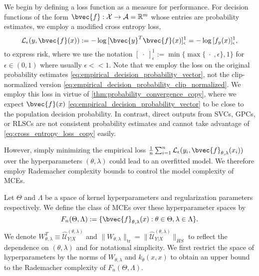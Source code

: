 \documentclass[twoside]{article}
\begin{document}
		We begin by defining a loss function as a measure for performance. For decision functions of the form $\bvec{f} : \mathcal{X} \to \mathcal{A} = \mathbb{R}^{m}$ whose entries are probability estimates, we employ a modified cross entropy loss,
		\begin{equation}
		\mathcal{L}_{\epsilon}(y, \bvec{f}(x)) := - \log{ [\bvec{y}^{T} \bvec{f}(x)]_{\epsilon}^{1} } = - \log{ [f_{y}(x)]_{\epsilon}^{1} },
		\label{eq:cross_entropy_loss_copy}
		\end{equation}
		to express risk, where we use the notation $[\;\cdot\;]_{\epsilon}^{1} := \min\{\max\{\;\cdot\;, \epsilon\}, 1\}$ for $\epsilon \in (0, 1)$ where usually $\epsilon << 1$. Note that we employ the loss on the original probability estimates \eqref{eq:empirical_decision_probability_vector}, not the clip-normalized version \eqref{eq:empirical_decision_probability_clip_normalized}. We employ this loss in virtue of \cref{thm:probability_convergence_copy}, where we expect $\bvec{f}(x)$ \eqref{eq:empirical_decision_probability_vector} to be close to the population decision probability. In contrast, direct outputs from \glspl{SVC}, \glspl{GPC}, or \glspl{RLSC} are not consistent probability estimates and cannot take advantage of \eqref{eq:cross_entropy_loss_copy} easily.
		
		However, simply minimizing the empirical loss $\frac{1}{n} \sum_{i = 1}^{n} \mathcal{L}_{\epsilon}(y_{i}, \bvec{f}_{\theta, \lambda}(x_{i}))$ over the hyperparameters $(\theta, \lambda)$ could lead to an overfitted model. We therefore employ Rademacher complexity bounds to control the model complexity of \glspl{MCE}.
		
		Let $\Theta$ and $\Lambda$ be a space of kernel hyperparameters and regularization parameters respectively. We define the class of \glspl{MCE} over these hyperparameter spaces by	
		\begin{equation}
			F_{n}(\Theta, \Lambda) := \{ \bvec{f}_{\theta, \lambda}(x) : \theta \in \Theta, \lambda \in \Lambda \}.
			\label{eq:predictor_class_copy}
		\end{equation}
		We denote $W_{\theta, \lambda}^{T} \equiv \hat{\mathcal{U}}^{(\theta, \lambda)}_{Y | X}$ and $\| W_{\theta, \lambda} \|_{\mathrm{tr}} = \| \hat{\mathcal{U}}^{(\theta, \lambda)}_{Y | X} \|_{HS}$ to reflect the dependence on $(\theta, \lambda)$ and for notational simplicity. We first restrict the space of hyperparameters by the norms of $W_{\theta, \lambda}$ and $k_{\theta}(x, x)$ to obtain an upper bound to the Rademacher complexity of $F_{n}(\Theta, \Lambda)$.
		
\end{document}
